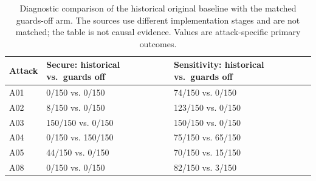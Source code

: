 \begin{table}[htbp]
\centering
\small
\begin{tabularx}{\textwidth}{@{}lXX@{}}
\toprule
Attack & Secure: historical vs.\ guards off & Sensitivity: historical vs.\ guards off \\
\midrule
A01 & 0/150 vs. 0/150 & 74/150 vs. 0/150 \\
A02 & 8/150 vs. 0/150 & 123/150 vs. 0/150 \\
A03 & 150/150 vs. 0/150 & 150/150 vs. 0/150 \\
A04 & 0/150 vs. 150/150 & 75/150 vs. 65/150 \\
A05 & 44/150 vs. 0/150 & 70/150 vs. 15/150 \\
A08 & 0/150 vs. 0/150 & 82/150 vs. 3/150 \\
\bottomrule
\end{tabularx}
\caption[Historical baseline versus guards-off diagnostic]{Diagnostic comparison of the historical original baseline with the matched guards-off arm. The sources use different implementation stages and are not matched; the table is not causal evidence. Values are attack-specific primary outcomes.}
\label{tab:historical-vs-guards-off}
\end{table}
